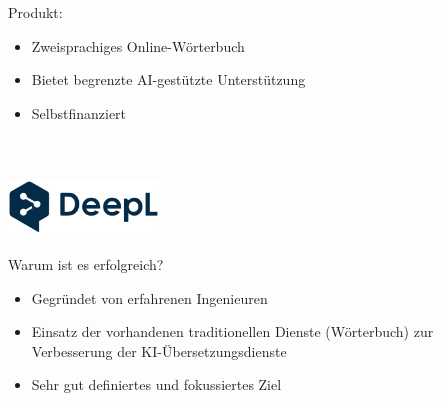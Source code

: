 \documentclass{beamer}
\begin{document}
\begin{frame}
    Produkt: \\
    \begin{itemize}
        \item<1-> Zweisprachiges Online-Wörterbuch
        \item<2-> Bietet begrenzte AI-gestützte Unterstützung
        \item<3-> Selbstfinanziert
    \end{itemize} ~\\
\end{frame}

\begin{frame}
    \frametitle{\includegraphics[width=0.3\textwidth]{deepl.png}}
    Warum ist es erfolgreich? \\
    \begin{itemize}
        \item<1-> Gegründet von erfahrenen Ingenieuren
        \item<2-> Einsatz der vorhandenen traditionellen Dienste (Wörterbuch) zur Verbesserung der KI-Übersetzungsdienste
        \item<3-> Sehr gut definiertes und fokussiertes Ziel
    \end{itemize} ~\\
\end{frame}
\end{document}
